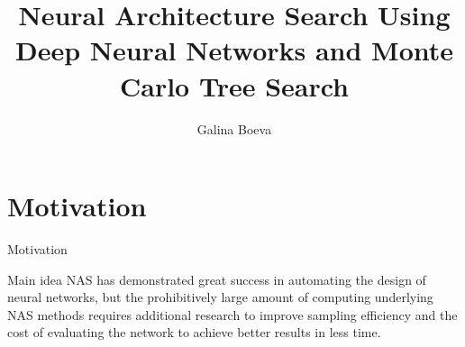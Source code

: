 \documentclass{beamer}
\title{Neural Architecture Search Using Deep Neural Networks and Monte Carlo Tree Search}
\author{Galina Boeva}
\institute{MIPT, 2024}
\begin{document}
\begin{frame}
    \titlepage
\end{frame}


\begin{frame}
    \tableofcontents
\end{frame}


\section{Motivation}
\begin{frame}{Motivation}
    \begin{block}{Main idea}
    NAS has demonstrated great success in automating the design of neural networks, but the prohibitively large amount of computing underlying NAS methods requires additional research to improve sampling efficiency and the cost of evaluating the network to achieve better results in less time.
    
    \end{block} 
    
\end{frame}
\end{document}
